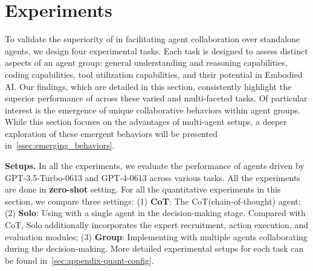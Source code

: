 \section{Experiments}
\label{sec:experiments}



To validate the superiority of \framework in facilitating agent collaboration over standalone agents, we design four experimental tasks. Each task is designed to assess distinct aspects of an agent group: general understanding and reasoning capabilities, coding capabilities, tool utilization capabilities, and their potential in Embodied AI. Our findings, which are detailed in this section, consistently highlight the superior performance of \framework across these varied and multi-faceted tasks. Of particular interest is the emergence of unique collaborative behaviors within agent groups. While this section focuses on the advantages of multi-agent setups, a deeper exploration of these emergent behaviors will be presented in~\cref{ssec:emerging_behaviors}.

\textbf{Setups.}
In all the experiments, we evaluate the performance of agents driven by GPT-3.5-Turbo-0613 and GPT-4-0613 across various tasks. All the experiments are done in \textbf{zero-shot} setting. For all the quantitative experiments in this section, we compare three settings: (1) \textbf{CoT}: The CoT(chain-of-thought) agent; (2) \textbf{Solo}: Using \framework with a single agent in the decision-making stage. Compared with CoT, Solo additionally incorporates the expert recruitment, action execution, and evaluation modules; (3) \textbf{Group}: Implementing \framework with multiple agents collaborating during the decision-making. More detailed experimental setups for each task can be found in~\cref{sec:appendix-quant-config}. 

